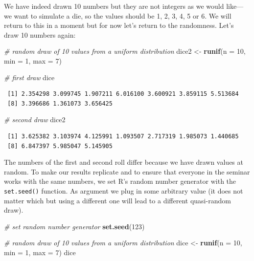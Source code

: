 \documentclass[]{article}
\newenvironment{Shaded}{\begin{snugshade}}{\end{snugshade}}
\newcommand{\KeywordTok}[1]{\textcolor[rgb]{0.13,0.29,0.53}{\textbf{#1}}}
\newcommand{\DataTypeTok}[1]{\textcolor[rgb]{0.13,0.29,0.53}{#1}}
\newcommand{\DecValTok}[1]{\textcolor[rgb]{0.00,0.00,0.81}{#1}}
\newcommand{\StringTok}[1]{\textcolor[rgb]{0.31,0.60,0.02}{#1}}
\newcommand{\CommentTok}[1]{\textcolor[rgb]{0.56,0.35,0.01}{\textit{#1}}}
\newcommand{\NormalTok}[1]{#1}
\theoremstyle{definition}
\theoremstyle{definition}
\theoremstyle{definition}
\theoremstyle{remark}
\begin{document}
We have indeed drawn 10 numbers but they are not integers as we would
like---we want to simulate a die, so the values should be 1, 2, 3, 4, 5
or 6. We will return to this in a moment but for now let's return to the
randomness. Let's draw 10 numbers again:

\begin{Shaded}
\begin{Highlighting}[]
\CommentTok{# random draw of 10 values from a uniform distribution}
\NormalTok{dice2 <-}\StringTok{ }\KeywordTok{runif}\NormalTok{(}\DataTypeTok{n =} \DecValTok{10}\NormalTok{, }\DataTypeTok{min =} \DecValTok{1}\NormalTok{, }\DataTypeTok{max =} \DecValTok{7}\NormalTok{)}

\CommentTok{# first draw}
\NormalTok{dice}
\end{Highlighting}
\end{Shaded}

\begin{verbatim}
 [1] 2.354298 3.099745 1.907211 6.016100 3.600921 3.859115 5.513684
 [8] 3.396686 1.361073 3.656425
\end{verbatim}

\begin{Shaded}
\begin{Highlighting}[]
\CommentTok{# second draw}
\NormalTok{dice2}
\end{Highlighting}
\end{Shaded}

\begin{verbatim}
 [1] 3.625382 3.103974 4.125991 1.093507 2.717319 1.985073 1.440685
 [8] 6.847397 5.985047 5.145905
\end{verbatim}

The numbers of the first and second roll differ because we have drawn
values at random. To make our results replicate and to ensure that
everyone in the seminar works with the same numbers, we set R's random
number generator with the \texttt{set.seed()} function. As argument we
plug in some arbitrary value (it does not matter which but using a
different one will lead to a different quasi-random draw).

\begin{Shaded}
\begin{Highlighting}[]
\CommentTok{# set random number generator}
\KeywordTok{set.seed}\NormalTok{(}\DecValTok{123}\NormalTok{)}

\CommentTok{# random draw of 10 values from a uniform distribution}
\NormalTok{dice <-}\StringTok{ }\KeywordTok{runif}\NormalTok{(}\DataTypeTok{n =} \DecValTok{10}\NormalTok{, }\DataTypeTok{min =} \DecValTok{1}\NormalTok{, }\DataTypeTok{max =} \DecValTok{7}\NormalTok{)}
\NormalTok{dice}
\end{Highlighting}
\end{Shaded}
\end{document}
